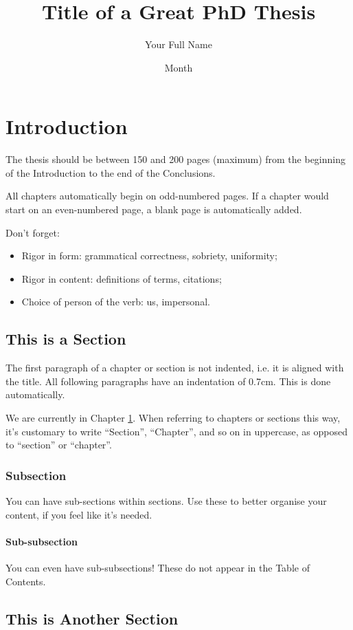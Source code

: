 \documentclass[12pt,reqno,twoside]{amsbook}
\title{Title of a Great PhD Thesis}
\author{Your Full Name}
\date{Month}{Year}
\begin{document}
\chapter{Introduction}\label{ch:introduction}
The thesis should be between 150 and 200 pages (maximum) from the beginning of the Introduction to the end of the Conclusions.

All chapters automatically begin on odd-numbered pages. If a chapter would start on an even-numbered page, a blank page is automatically added.

Don't forget:
\begin{itemize}
    \item Rigor in form: grammatical correctness, sobriety, uniformity;
    \item Rigor in content: definitions of terms, citations;
    \item Choice of person of the verb: us, impersonal.
\end{itemize}


\section{This is a Section}\label{sec:example_section}
The first paragraph of a chapter or section is not indented, i.e. it is aligned with the title. All following paragraphs have an indentation of 0.7cm. This is done automatically.

We are currently in Chapter \ref{ch:introduction}. When referring to chapters or sections this way, it's customary to write ``Section'', ``Chapter'', and so on in uppercase, as opposed to ``section'' or ``chapter''.

\subsection{Subsection}
You can have sub-sections within sections. Use these to better organise your content, if you feel like it's needed.

\subsubsection{Sub-subsection}
You can even have sub-subsections! These do not appear in the Table of Contents.

\section{This is Another Section}
\end{document}
